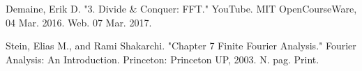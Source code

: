 \documentclass{beamer}
\begin{document}
\begin{frame}
	\begin{thebibliography}{99}
		
		Demaine, Erik D. "3. Divide \& Conquer: FFT." YouTube. MIT OpenCourseWare, 04 Mar. 2016. Web. 07 Mar. 2017.
		
		Stein, Elias M., and Rami Shakarchi. "Chapter 7 Finite Fourier Analysis." Fourier Analysis: An Introduction. Princeton: Princeton UP, 2003. N. pag. Print.
		
	\end{thebibliography}
	
\end{frame}
\end{document}
